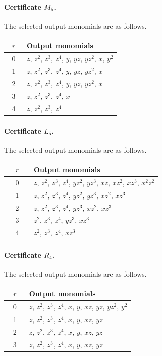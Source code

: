 \documentclass[11pt]{amsart}
\theoremstyle{definition}
\theoremstyle{remark}
\numberwithin{equation}{section}
\begin{document}
\paragraph{Certificate $M_5$.} The selected output monomials are as follows.
\begin{center}
\begin{tabular}{cp{0.83\linewidth}}
$r$ & Output monomials\\\hline
0 & \(z\), \(z^{2}\), \(z^{3}\), \(z^{4}\), \(y\), \(yz\), \(yz^{2}\), \(x\), \(y^{2}\)\\
1 & \(z\), \(z^{2}\), \(z^{3}\), \(z^{4}\), \(y\), \(yz\), \(yz^{2}\), \(x\)\\
2 & \(z\), \(z^{2}\), \(z^{3}\), \(z^{4}\), \(y\), \(yz\), \(yz^{2}\), \(x\)\\
3 & \(z\), \(z^{2}\), \(z^{3}\), \(z^{4}\), \(x\)\\
4 & \(z\), \(z^{2}\), \(z^{3}\), \(z^{4}\)\\
\end{tabular}
\end{center}

\paragraph{Certificate $L_5$.} The selected output monomials are as follows.
\begin{center}
\begin{tabular}{cp{0.83\linewidth}}
$r$ & Output monomials\\\hline
0 & \(z\), \(z^{2}\), \(z^{3}\), \(z^{4}\), \(yz^{2}\), \(yz^{3}\), \(xz\), \(xz^{2}\), \(xz^{3}\), \(x^{2}z^{2}\)\\
1 & \(z\), \(z^{2}\), \(z^{3}\), \(z^{4}\), \(yz^{2}\), \(yz^{3}\), \(xz^{2}\), \(xz^{3}\)\\
2 & \(z\), \(z^{2}\), \(z^{3}\), \(z^{4}\), \(yz^{3}\), \(xz^{2}\), \(xz^{3}\)\\
3 & \(z^{2}\), \(z^{3}\), \(z^{4}\), \(yz^{3}\), \(xz^{3}\)\\
4 & \(z^{2}\), \(z^{3}\), \(z^{4}\), \(xz^{3}\)\\
\end{tabular}
\end{center}

\paragraph{Certificate $R_4$.} The selected output monomials are as follows.
\begin{center}
\begin{tabular}{cp{0.83\linewidth}}
$r$ & Output monomials\\\hline
0 & \(z\), \(z^{2}\), \(z^{3}\), \(z^{4}\), \(x\), \(y\), \(xz\), \(yz\), \(yz^{2}\), \(y^{2}\)\\
1 & \(z\), \(z^{2}\), \(z^{3}\), \(z^{4}\), \(x\), \(y\), \(xz\), \(yz\)\\
2 & \(z\), \(z^{2}\), \(z^{3}\), \(z^{4}\), \(x\), \(y\), \(xz\), \(yz\)\\
3 & \(z\), \(z^{2}\), \(z^{3}\), \(z^{4}\), \(x\), \(y\), \(xz\), \(yz\)\\
\end{tabular}
\end{center}
\end{document}
